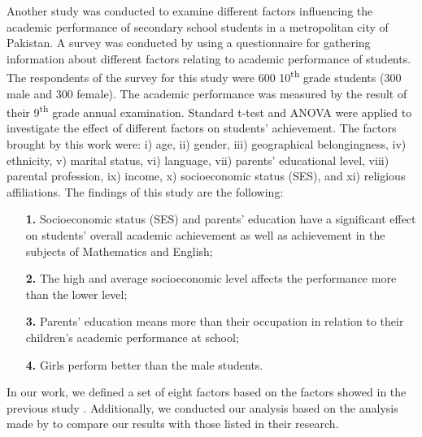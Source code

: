 \documentclass[12pt]{article}
\begin{document}
Another study \cite{Farooq2012FACTORSAS} was conducted to examine different factors influencing the academic performance of secondary school students in a metropolitan city of Pakistan. A survey was conducted by using a questionnaire for gathering information about different factors relating to academic performance of students. The respondents of the survey for this study were 600 10\textsuperscript{th} grade students (300 male and 300 female). The academic performance was measured by the result of their 9\textsuperscript{th} grade annual examination. Standard t-test and ANOVA were applied to investigate the effect of different factors on students’ achievement. The factors brought by this work were: i) age, ii) gender, iii) geographical belongingness, iv) ethnicity, v) marital status, vi) language, vii) parents’ educational level, viii) parental profession, ix) income, x) socioeconomic status (SES), and xi) religious affiliations. The findings of this study are the following: 

\begin{itemize}
    \item[\textbf{1.}] Socioeconomic status (SES) and parents’ education have a significant effect on students’ overall academic achievement as  well as achievement in the subjects of Mathematics and English;  
\end{itemize}

\begin{itemize}
    \item[\textbf{2.}] The high and average socioeconomic level affects the performance more than the lower level;  
\end{itemize}

\begin{itemize}
    \item[\textbf{3.}] Parents’ education means more than their occupation in relation to their children’s academic performance at school;
\end{itemize}

\begin{itemize}
    \item[\textbf{4.}] Girls perform better than the male students.    
\end{itemize}

In our work, we defined a set of eight factors based on the factors showed in the previous study \cite{Farooq2012FACTORSAS}. Additionally, we conducted our analysis based on the analysis made by \cite{Farooq2012FACTORSAS} to compare our results with those listed in their research.  
\end{document}
